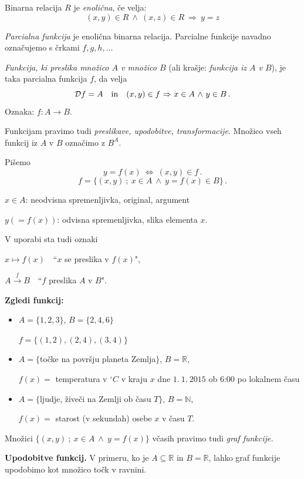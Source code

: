 \documentclass[11pt,paper=b5,footinclude,headinclude]{scrbook} %
\def\inn {{~\wedge~}}
\def\sledi {{~\Rightarrow~}}
\def\cee {{~\Leftrightarrow~}}
\begin{document}
\medskip
Binarna relacija $R$ je {\em enolična}, če velja:
$$(x,y)\in R \inn (x,z)\in R\sledi y = z$$

{\em Parcialna funkcija} je enolična binarna relacija. Parcialne funkcije navadno označujemo s črkami $f, g,h,\ldots$

\emph{ Funkcija, ki preslika množico $A$ v množico $B$} (ali krašje: {\em funkcija iz $A$ v $B$}), je taka parcialna funkcija $f$, da
velja
$${\cal D}f= A \textrm{~~~in~~~} (x,y)\in f\sledi x\in A\inn y\in B\,.$$
Oznaka: $f:A\to B$.

Funkcijam pravimo tudi {\em preslikave, upodobitve, transformacije}.
Množico vseh funkcij iz $A$ v $B$ označimo z $B^A$.

\bigskip

Pišemo
$$y=f(x)\cee (x,y)\in f\,.$$
$$f = \{(x,y)~;~x\in A\inn y = f(x)\in B\}\,.$$

$x\in A$: neodvisna spremenljivka, original, argument

$y (= f(x))$: odvisna spremenljivka, slika elementa $x$.

\medskip

V uporabi sta tudi oznaki

$x\mapsto f(x)$~~``$x$ se preslika v $f(x)$",

$A\overset{f}{\to} B$~~``$f$ preslika $A$ v $B$".

\bigskip
\textbf{ Zgledi funkcij:}
\begin{itemize}
  \item $A = \{1,2,3\}$, $B = \{2,4,6\}$

  $f = \{(1,2),(2,4),(3,4)\}$

  \item $A = \{$točke na površju planeta Zemlja$\}$, $B = \mathbb{R}$,

$f(x) = $ temperatura v $^\circ C$ v kraju $x$ dne $1.~1.~2015$ ob 6:00 po lokalnem času

  \item $A = \{$ljudje, živeči na Zemlji ob času $T\}$, $B = \mathbb{N}$,

$f(x) = $ starost (v sekundah) osebe $x$ v času $T$.
\end{itemize}

\bigskip
Množici $\{(x,y)~;~x\in A\inn y = f(x)\}$ včasih pravimo tudi {\em graf funkcije.}

\bigskip
\textbf{ Upodobitve funkcij.}
V primeru, ko je $A\subseteq \mathbb{R}$ in $B = \mathbb{R}$, lahko graf funkcije upodobimo kot množico točk v ravnini.
\end{document}
